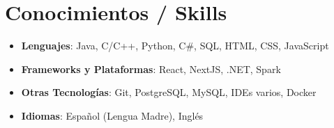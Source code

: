 \documentclass[letterpaper,11pt]{article}
\makeatletter
\newcommand{\resumeItem}[2]{
  \item\small{
    \textbf{#1}{ #2 \vspace{-2pt}}
  }
}
\newcommand{\resumeSubheading}[4]{
  \vspace{-1pt}\item
    \begin{tabular*}{0.97\textwidth}{l@{\extracolsep{\fill}}r}
      \textbf{#1} & #2 \\
      \textit{\small#3} & \textit{\small #4} \\
    \end{tabular*}\vspace{-5pt}
}
\newcommand{\resumeSubItem}[2]{\resumeItem{#1}{#2}\vspace{-4pt}}
\newcommand{\resumeSubHeadingListStart}{\begin{itemize}[leftmargin=*]}
\newcommand{\resumeSubHeadingListEnd}{\end{itemize}}
\newcommand{\resumeItemListStart}{\begin{itemize}}
\newcommand{\resumeItemListEnd}{\end{itemize}\vspace{-5pt}}
\makeatother
\begin{document}
\section{Conocimientos / Skills}
  \resumeSubHeadingListStart
    \resumeSubItem{}{
      \textbf{Lenguajes}{: Java, C/C++, Python, C\#, SQL, HTML, CSS, JavaScript }
    }
    \resumeSubItem{}{
      \textbf{Frameworks y Plataformas}{: React, NextJS, .NET, Spark }
    }
    \resumeSubItem{}{
      \textbf{Otras Tecnologías}{: Git, PostgreSQL, MySQL, IDEs varios, Docker }
    }
    \resumeSubItem{}{
      \textbf{Idiomas}{: Español (Lengua Madre), Inglés }
    }
  \resumeSubHeadingListEnd

%
%
%
\end{document}
